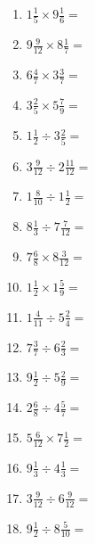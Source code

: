 \documentclass[12pt]{article}
\begin{document}
\begin{enumerate}
\item \large $ 1 \frac{1}{5} \times 9 \frac{1}{6} = $ \vspace{1.6cm}
\item \large $ 9 \frac{9}{12} \times 8 \frac{1}{7} = $ \vspace{1.6cm}
\item \large $ 6 \frac{4}{7} \times 3 \frac{3}{7} = $ \vspace{1.6cm}
\item \large $ 3 \frac{2}{5} \times 5 \frac{7}{9} = $ \vspace{1.6cm}
\newpage
\item \large $ 1 \frac{1}{2} \div 3 \frac{2}{5} = $ \vspace{1.6cm}
\item \large $ 3 \frac{9}{12} \div 2 \frac{11}{12} = $ \vspace{1.6cm}
\item \large $ 1 \frac{8}{10} \div 1 \frac{1}{2} = $ \vspace{1.6cm}
\item \large $ 8 \frac{1}{3} \div 7 \frac{7}{12} = $ \vspace{1.6cm}
\item \large $ 7 \frac{6}{8} \times 8 \frac{3}{12} = $ \vspace{1.6cm}
\item \large $ 1 \frac{1}{2} \times 1 \frac{5}{9} = $ \vspace{1.6cm}
\item \large $ 1 \frac{4}{11} \div 5 \frac{2}{4} = $ \vspace{1.6cm}
\item \large $ 7 \frac{3}{7} \div 6 \frac{2}{3} = $ \vspace{1.6cm}
\item \large $ 9 \frac{1}{2} \div 5 \frac{2}{9} = $ \vspace{1.6cm}
\item \large $ 2 \frac{6}{8} \div 4 \frac{5}{7} = $ \vspace{1.6cm}
\newpage
\item \large $ 5 \frac{6}{12} \times 7 \frac{1}{2} = $ \vspace{1.6cm}
\item \large $ 9 \frac{1}{3} \div 4 \frac{1}{3} = $ \vspace{1.6cm}
\item \large $ 3 \frac{9}{12} \div 6 \frac{9}{12} = $ \vspace{1.6cm}
\item \large $ 9 \frac{1}{2} \div 8 \frac{5}{10} = $ \vspace{1.6cm}

\end{enumerate}
\end{document}
